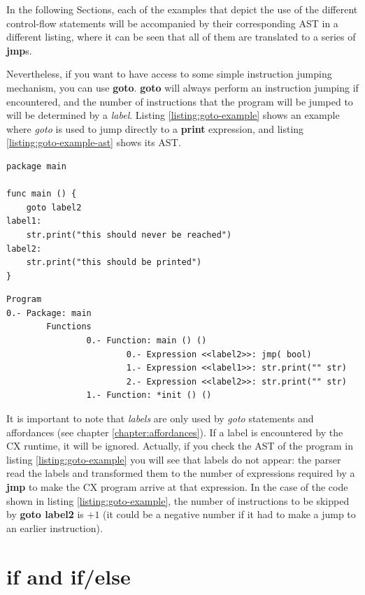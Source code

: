 \documentclass[11pt,fleqn,openany]{book} %
\begin{document}
In the following Sections, each of the examples that depict the use of the different control-flow statements will be accompanied by their corresponding AST in a different listing, where it can be seen that all of them are translated to a series of \textbf{jmp}s.

Nevertheless, if you want to have access to some simple instruction jumping mechanism, you can use \textbf{goto}. \textbf{goto} will always perform an instruction jumping if encountered, and the number of instructions that the program will be jumped to will be determined by a \emph{label}. Listing \ref{listing:goto-example} shows an example where \emph{goto} is used to jump directly to a \textbf{print} expression, and listing \ref{listing:goto-example-ast} shows its AST.

\begin{lstlisting}[caption={Using $goto$ for control flow},captionpos=b,label={listing:goto-example}]
package main

func main () {
	goto label2
label1:
	str.print("this should never be reached")
label2:
	str.print("this should be printed")
}
\end{lstlisting}

\begin{lstlisting}[caption={Abstract syntax tree of listing \ref{listing:goto-example}},captionpos=b,label={listing:goto-example-ast}]
Program
0.- Package: main
        Functions
                0.- Function: main () ()
                        0.- Expression <<label2>>: jmp( bool)
                        1.- Expression <<label1>>: str.print("" str)
                        2.- Expression <<label2>>: str.print("" str)
                1.- Function: *init () ()
\end{lstlisting}


It is important to note that \emph{labels} are only used by \emph{goto} statements and affordances (see chapter \ref{chapter:affordances}). If a label is encountered by the CX runtime, it will be ignored. Actually, if you check the AST of the program in listing \ref{listing:goto-example} you will see that labels do not appear: the parser read the labels and transformed them to the number of expressions required by a \textbf{jmp} to make the CX program arrive at that expression. In the case of the code shown in listing \ref{listing:goto-example}, the number of instructions to be skipped by \textbf{goto label2} is $+1$ (it could be a negative number if it had to make a jump to an earlier instruction).

\section{if and if/else}
\end{document}

